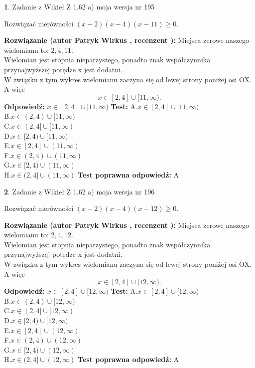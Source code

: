 \documentclass[12pt, a4paper]{article}
\theoremstyle{definition} %
\newtheorem{zad}{}
\newcommand{\zadStart}[1]{\begin{zad}#1\newline}
\newcommand{\zadStop}{\end{zad}}
\newcommand{\rozwStart}[2]{\noindent \textbf{Rozwiązanie (autor #1 , recenzent #2): }\newline}
\newcommand{\rozwStop}{\newline}
\newcommand{\odpStart}{\noindent \textbf{Odpowiedź:}\newline}
\newcommand{\odpStop}{\newline}
\newcommand{\testStart}{\noindent \textbf{Test:}\newline}
\newcommand{\testStop}{\newline}
\newcommand{\kluczStart}{\noindent \textbf{Test poprawna odpowiedź:}\newline}
\newcommand{\kluczStop}{\newline}
\begin{document}
\zadStart{Zadanie z Wikieł Z 1.62 a) moja wersja nr 195}

Rozwiązać nierówności $(x-2)(x-4)(x-11)\ge0$.
\zadStop
\rozwStart{Patryk Wirkus}{}
Miejsca zerowe naszego wielomianu to: $2, 4, 11$.\\
Wielomian jest stopnia nieparzystego, ponadto znak współczynnika przy\linebreak najwyższej potędze x jest dodatni.\\ W związku z tym wykres wielomianu zaczyna się od lewej strony poniżej osi OX. A więc $$x \in [2,4] \cup [11,\infty).$$
\rozwStop
\odpStart
$x \in [2,4] \cup [11,\infty)$
\odpStop
\testStart
A.$x \in [2,4] \cup [11,\infty)$\\
B.$x \in (2,4) \cup [11,\infty)$\\
C.$x \in (2,4] \cup [11,\infty)$\\
D.$x \in [2,4) \cup [11,\infty)$\\
E.$x \in [2,4] \cup (11,\infty)$\\
F.$x \in (2,4) \cup (11,\infty)$\\
G.$x \in [2,4) \cup (11,\infty)$\\
H.$x \in (2,4] \cup (11,\infty)$
\testStop
\kluczStart
A
\kluczStop



\zadStart{Zadanie z Wikieł Z 1.62 a) moja wersja nr 196}

Rozwiązać nierówności $(x-2)(x-4)(x-12)\ge0$.
\zadStop
\rozwStart{Patryk Wirkus}{}
Miejsca zerowe naszego wielomianu to: $2, 4, 12$.\\
Wielomian jest stopnia nieparzystego, ponadto znak współczynnika przy\linebreak najwyższej potędze x jest dodatni.\\ W związku z tym wykres wielomianu zaczyna się od lewej strony poniżej osi OX. A więc $$x \in [2,4] \cup [12,\infty).$$
\rozwStop
\odpStart
$x \in [2,4] \cup [12,\infty)$
\odpStop
\testStart
A.$x \in [2,4] \cup [12,\infty)$\\
B.$x \in (2,4) \cup [12,\infty)$\\
C.$x \in (2,4] \cup [12,\infty)$\\
D.$x \in [2,4) \cup [12,\infty)$\\
E.$x \in [2,4] \cup (12,\infty)$\\
F.$x \in (2,4) \cup (12,\infty)$\\
G.$x \in [2,4) \cup (12,\infty)$\\
H.$x \in (2,4] \cup (12,\infty)$
\testStop
\kluczStart
A
\kluczStop
\end{document}
